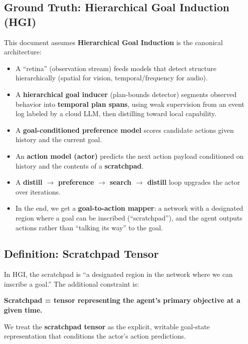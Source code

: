 \documentclass[12pt, a4paper]{article}
\begin{document}
\bigskip

\subsection*{Ground Truth: Hierarchical Goal Induction (HGI)}

This document assumes \textbf{Hierarchical Goal Induction} is the canonical architecture:

\begin{itemize}
  \item A ``retina'' (observation stream) feeds models that detect structure hierarchically (spatial for vision, temporal/frequency for audio).
  \item A \textbf{hierarchical goal inducer} (plan-bounds detector) segments observed behavior into \textbf{temporal plan spans}, using weak supervision from an event log labeled by a cloud LLM, then distilling toward local capability.
  \item A \textbf{goal-conditioned preference model} scores candidate actions given history and the current goal.
  \item An \textbf{action model (actor)} predicts the next action payload conditioned on history and the contents of a \textbf{scratchpad}.
  \item A \textbf{distill $\to$ preference $\to$ search $\to$ distill} loop upgrades the actor over iterations.
  \item In the end, we get a \textbf{goal-to-action mapper}: a network with a designated region where a goal can be inscribed (``scratchpad''), and the agent outputs actions rather than ``talking its way'' to the goal.
\end{itemize}

\subsection*{Definition: Scratchpad Tensor}

In HGI, the scratchpad is ``a designated region in the network where we can inscribe a goal.'' The additional constraint is:

\begin{quoting}
\textbf{Scratchpad = tensor representing the agent's primary objective at a given time.}
\end{quoting}

\noindent We treat the \textbf{scratchpad tensor} as the explicit, writable goal-state representation that conditions the actor's action predictions.
\end{document}

